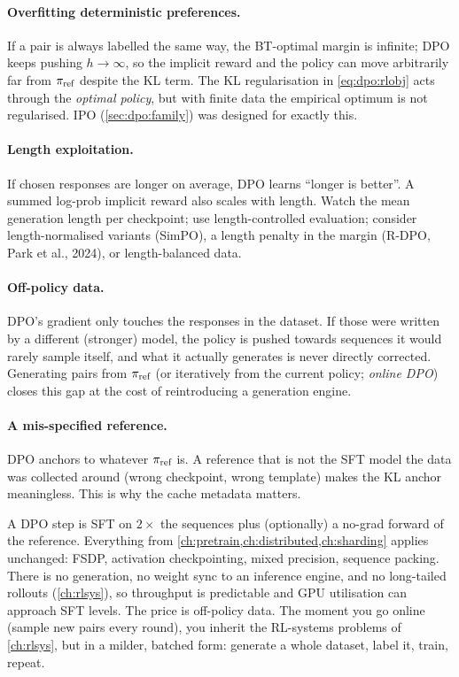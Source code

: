 \paragraph{Overfitting deterministic preferences.} If a pair is always labelled the same way, the
BT-optimal margin is infinite; DPO keeps pushing $h\to\infty$, so the implicit reward and the
policy can move arbitrarily far from $\pi_{\text{ref}}$ despite the KL term. The KL regularisation in
\eqref{eq:dpo:rlobj} acts through the \emph{optimal policy}, but with finite data the empirical
optimum is not regularised. IPO (\cref{sec:dpo:family}) was designed for exactly this.

\paragraph{Length exploitation.} If chosen responses are longer on average, DPO learns
``longer is better''. A summed log-prob implicit reward also scales with length. Watch the mean
generation length per checkpoint; use length-controlled evaluation; consider length-normalised
variants (SimPO), a length penalty in the margin (R-DPO, Park et al., 2024), or length-balanced data.

\paragraph{Off-policy data.} DPO's gradient only touches the responses in the dataset. If those
were written by a different (stronger) model, the policy is pushed towards sequences it would
rarely sample itself, and what it actually generates is never directly corrected. Generating pairs
from $\pi_{\text{ref}}$ (or iteratively from the current policy; \emph{online DPO}) closes this gap at the
cost of reintroducing a generation engine.

\paragraph{A mis-specified reference.} DPO anchors to whatever $\pi_{\text{ref}}$ is. A reference that is not
the SFT model the data was collected around (wrong checkpoint, wrong template) makes the KL
anchor meaningless. This is why the cache metadata matters.

\begin{systemslens}
A DPO step is SFT on $2\times$ the sequences plus (optionally) a no-grad forward of the
reference. Everything from \cref{ch:pretrain,ch:distributed,ch:sharding} applies unchanged:
FSDP, activation checkpointing, mixed precision, sequence packing. There is no generation, no
weight sync to an inference engine, and no long-tailed rollouts (\cref{ch:rlsys}), so throughput is
predictable and GPU utilisation can approach SFT levels. The price is off-policy data. The moment
you go online (sample new pairs every round), you inherit the RL-systems problems of
\cref{ch:rlsys}, but in a milder, batched form: generate a whole dataset, label it, train, repeat.
\end{systemslens}

